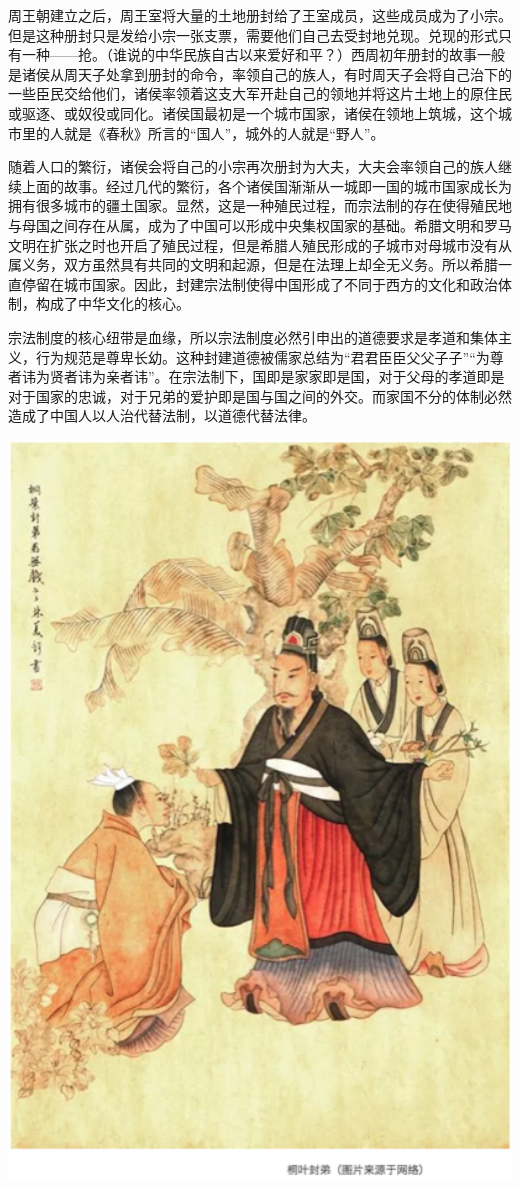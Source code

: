 \documentclass[]{book}
\begin{document}
周王朝建立之后，周王室将大量的土地册封给了王室成员，这些成员成为了小宗。但是这种册封只是发给小宗一张支票，需要他们自己去受封地兑现。兑现的形式只有一种------抢。（谁说的中华民族自古以来爱好和平？）西周初年册封的故事一般是诸侯从周天子处拿到册封的命令，率领自己的族人，有时周天子会将自己治下的一些臣民交给他们，诸侯率领着这支大军开赴自己的领地并将这片土地上的原住民或驱逐、或奴役或同化。诸侯国最初是一个城市国家，诸侯在领地上筑城，这个城市里的人就是《春秋》所言的``国人''，城外的人就是``野人''。

随着人口的繁衍，诸侯会将自己的小宗再次册封为大夫，大夫会率领自己的族人继续上面的故事。经过几代的繁衍，各个诸侯国渐渐从一城即一国的城市国家成长为拥有很多城市的疆土国家。显然，这是一种殖民过程，而宗法制的存在使得殖民地与母国之间存在从属，成为了中国可以形成中央集权国家的基础。希腊文明和罗马文明在扩张之时也开启了殖民过程，但是希腊人殖民形成的子城市对母城市没有从属义务，双方虽然具有共同的文明和起源，但是在法理上却全无义务。所以希腊一直停留在城市国家。因此，封建宗法制使得中国形成了不同于西方的文化和政治体制，构成了中华文化的核心。

宗法制度的核心纽带是血缘，所以宗法制度必然引申出的道德要求是孝道和集体主义，行为规范是尊卑长幼。这种封建道德被儒家总结为``君君臣臣父父子子''``为尊者讳为贤者讳为亲者讳''。在宗法制下，国即是家家即是国，对于父母的孝道即是对于国家的忠诚，对于兄弟的爱护即是国与国之间的外交。而家国不分的体制必然造成了中国人以人治代替法制，以道德代替法律。

\includegraphics[width=5.67in]{images/gx3}
\end{document}
